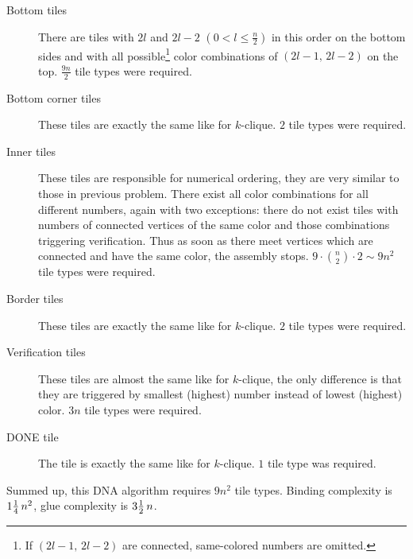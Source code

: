 \begin{description}
	\item[Bottom tiles] There are tiles with $2l$ and $2l-2$ $(0 < l \leq \frac{n}{2})$ in this order on the bottom sides and with all possible\footnote{If $(2l-1,\,2l-2)$ are connected, same-colored numbers are omitted.} color combinations of $(2l-1,\,2l-2)$ on the top. $\frac{9n}{2}$ tile types were required.
	\item[Bottom corner tiles] These tiles are exactly the same like for $k$-clique. $2$ tile types were required.
	\item[Inner tiles] These tiles are responsible for numerical ordering, they are very similar to those in previous problem. There exist all color combinations for all different numbers, again with two exceptions: there do not exist tiles with numbers of connected vertices of the same color and those combinations triggering verification. Thus as soon as there meet vertices which are connected and have the same color, the assembly stops. $9\cdot\binom{n}{2}\cdot 2 \sim 9n^2$ tile types were required.
	\item[Border tiles] These tiles are exactly the same like for $k$-clique. $2$ tile types were required.
	\item[Verification tiles] These tiles are almost the same like for $k$-clique, the only difference is that they are triggered by smallest (highest) number instead of lowest (highest) color. $3n$ tile types were required.
	\item[DONE tile] The tile is exactly the same like for $k$-clique. $1$ tile type was required.
\end{description}
Summed up, this DNA algorithm requires $9n^2$ tile types. Binding complexity is $1\nicefrac{1}{4}\,n^2$, glue complexity is $3\nicefrac{1}{2}\,n$.

